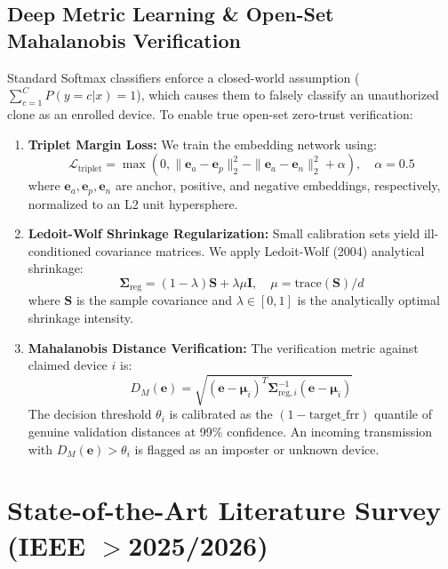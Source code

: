 \documentclass[11pt,a4paper]{article}
\begin{document}
\subsection{Deep Metric Learning \& Open-Set Mahalanobis Verification}
Standard Softmax classifiers enforce a closed-world assumption ($\sum_{c=1}^C P(y=c|x) = 1$), which causes them to falsely classify an unauthorized clone as an enrolled device. To enable true open-set zero-trust verification:
\begin{enumerate}\setlength\itemsep{0.1em}
    \item \textbf{Triplet Margin Loss:} We train the embedding network using:
    \begin{equation}
    \mathcal{L}_{\text{triplet}} = \max\left(0, \|\mathbf{e}_a - \mathbf{e}_p\|_2^2 - \|\mathbf{e}_a - \mathbf{e}_n\|_2^2 + \alpha\right), \quad \alpha = 0.5
    \end{equation}
    where $\mathbf{e}_a, \mathbf{e}_p, \mathbf{e}_n$ are anchor, positive, and negative embeddings, respectively, normalized to an L2 unit hypersphere.
    \item \textbf{Ledoit-Wolf Shrinkage Regularization:} Small calibration sets yield ill-conditioned covariance matrices. We apply Ledoit-Wolf (2004) analytical shrinkage:
    \begin{equation}
    \mathbf{\Sigma}_{\text{reg}} = (1 - \lambda)\mathbf{S} + \lambda \mu \mathbf{I}, \quad \mu = \text{trace}(\mathbf{S})/d
    \end{equation}
    where $\mathbf{S}$ is the sample covariance and $\lambda \in [0, 1]$ is the analytically optimal shrinkage intensity.
    \item \textbf{Mahalanobis Distance Verification:} The verification metric against claimed device $i$ is:
    \begin{equation}
    D_M(\mathbf{e}) = \sqrt{(\mathbf{e} - \boldsymbol{\mu}_i)^T \mathbf{\Sigma}_{\text{reg},i}^{-1} (\mathbf{e} - \boldsymbol{\mu}_i)}
    \end{equation}
    The decision threshold $\theta_i$ is calibrated as the $(1 - \text{target\_frr})$ quantile of genuine validation distances at 99\% confidence. An incoming transmission with $D_M(\mathbf{e}) > \theta_i$ is flagged as an imposter or unknown device.
\end{enumerate}

\section{State-of-the-Art Literature Survey (IEEE $>$2025/2026)}
\end{document}
